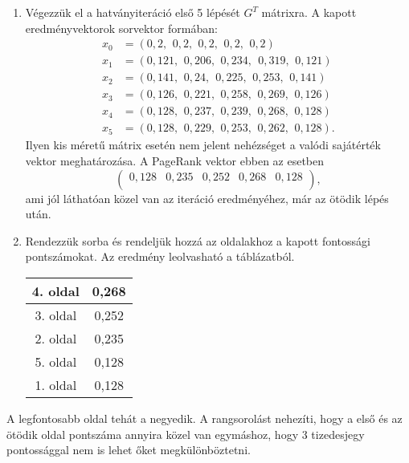 \documentclass[12pt,a4paper]{article}
\begin{document}
\begin{enumerate}[label=(\Roman*)]
\item Végezzük el a hatványiteráció első 5 lépését $G^T$ mátrixra. A kapott eredményvektorok sorvektor formában:
\[
\begin{split}
x_0 & = ( 0,\!2, \ \,0,\!2, \! \ \, 0,\!2 ,\ \, 0,\!2 ,\ \, 0,\!2   ) \\
x_1 & = (  0,\!121 ,\ \, 0,\!206 ,\ \, 0,\!234 ,\ \ 0,\!319 ,\ \, 0,\!121 )\\   
x_2 & = (  0,\!141 ,\ \, 0,\!24,\ \ 0,\!225 ,\ \, 0,\!253 ,\ \, 0,\!141 )\\   
x_3 & = (  0,\!126 ,\ \, 0,\!221 ,\ \, 0,\!258 ,\ \, 0,\!269 ,\ \, 0,\!126) \\  
x_4 & = (  0,\!128 ,\ \, 0,\!237 ,\ \, 0,\!239 ,\ \, 0,\!268 ,\ \, 0,\!128 )\\  
x_5 & = (  0,\!128 ,\ \, 0,\!229 ,\ \, 0,\!253 ,\ \, 0,\!262 ,\ \, 0,\!128 ). 
\end{split}
\]
Ilyen kis méretű mátrix esetén nem jelent nehézséget a valódi sajátérték vektor 
meghatározása. A PageRank vektor ebben az esetben
\[\begin{pmatrix} 0,128 & 0,235 & 0,252 & 0,268 & 0,128 \\ \end{pmatrix},\]
ami jól láthatóan közel van az iteráció eredményéhez, már az ötödik lépés után.

\item Rendezzük sorba és rendeljük hozzá az oldalakhoz a kapott fontossági pontszámokat. Az eredmény leolvasható a táblázatból.
\begin{center}
	\begin{tabular}{c | c}
		4. oldal & 0,268 \\
		\hline
		3. oldal & 0,252 \\
		2. oldal & 0,235 \\
		5. oldal & 0,128 \\
		1. oldal & 0,128 \\
	\end{tabular}
\end{center}
\end{enumerate}
A legfontosabb oldal tehát a negyedik. A rangsorolást nehezíti, hogy a első és az ötödik oldal pontszáma annyira közel van egymáshoz, hogy 3 tizedesjegy pontossággal nem is lehet őket megkülönböztetni.



\end{document}

